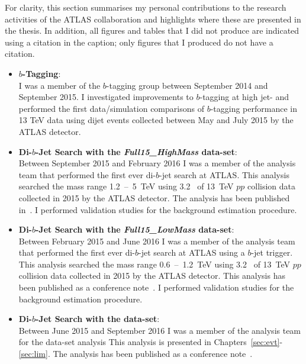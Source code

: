 For clarity, this section summarises my personal contributions to the research activities of the ATLAS collaboration
and highlights where these are presented in the thesis.
In addition, all figures and tables that I did not produce are indicated using a citation in the caption;
only figures that I produced do not have a citation.


\begin{itemize}[leftmargin=*]
\item\textbf{$b$-Tagging}:\\
  I was a member of the $b$-tagging group between September 2014 and September 2015.
  I investigated improvements to $b$-tagging at high jet-\pT{} and
  performed the first data/simulation comparisons of $b$-tagging performance in 13 TeV data using dijet events collected between May and July 2015 by the ATLAS detector. \vspace{1em}
\item\textbf{Di-$b$-Jet Search with the \textit{Full15\_HighMass} data-set}:\\
  Between September 2015 and February 2016 I was a member of the analysis team that performed the first ever di-$b$-jet search at ATLAS.
  This analysis searched the mass range 1.2~--~5~TeV using 3.2~\ifb{} of 13~TeV $pp$ collision data collected in 2015 by the ATLAS detector.
  The analysis has been published in~\cite{dibjet-mori16_paper}. 
  I performed validation studies for the background estimation procedure. \vspace{1em}
\item\textbf{Di-$b$-Jet Search with the \textit{Full15\_LowMass} data-set}:\\
  Between February 2015 and June 2016 I was a member of the analysis team that performed the first ever di-$b$-jet search at ATLAS using a $b$-jet trigger.
  This analysis searched the mass range 0.6~--~1.2~TeV using 3.2~\ifb{} of 13~TeV $pp$ collision data collected in 2015 by the ATLAS detector.
  This analysis has been published as a conference note~\cite{dibjet-lhcp_conf}.
  I performed validation studies for the background estimation procedure. \vspace{1em}
    \newpage
\item\textbf{Di-$b$-Jet Search  with the \summer{} data-set}:\\ 
  Between June 2015 and September 2016 I was a member of the analysis team for the \summer{} data-set analysis
  This analysis is presented in Chapters~\ref{sec:evt}-\ref{sec:lim}.
  The analysis has been published as a conference note~\cite{dibjet-ichep_conf}. 

\end{itemize}
